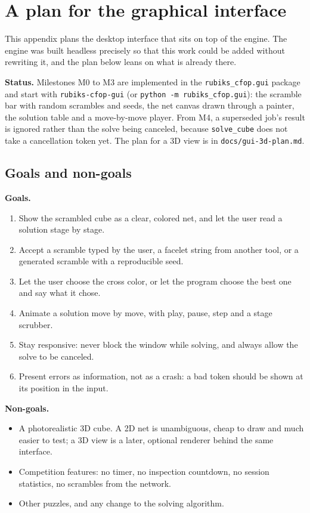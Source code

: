 \section{A plan for the graphical interface}
\label{app:gui}

This appendix plans the desktop interface that sits on top of the engine.  The
engine was built headless precisely so that this work could be added without
rewriting it, and the plan below leans on what is already there.

\textbf{Status.}  Milestones M0 to M3 are implemented in the \texttt{rubiks\_cfop.gui}
package and start with \texttt{rubiks-cfop-gui} (or \texttt{python -m
rubiks\_cfop.gui}): the scramble bar with random scrambles and seeds, the net
canvas drawn through a painter, the solution table and a move-by-move player.  From
M4, a superseded job's result is ignored rather than the solve being canceled,
because \texttt{solve\_cube} does not take a cancellation token yet.  The plan for a
3D view is in \texttt{docs/gui-3d-plan.md}.

\subsection{Goals and non-goals}

\textbf{Goals.}

\begin{enumerate}[leftmargin=1.4em]
  \item Show the scrambled cube as a clear, colored net, and let the user read a
  solution stage by stage.
  \item Accept a scramble typed by the user, a facelet string from another tool, or
  a generated scramble with a reproducible seed.
  \item Let the user choose the cross color, or let the program choose the best one
  and say what it chose.
  \item Animate a solution move by move, with play, pause, step and a stage scrubber.
  \item Stay responsive: never block the window while solving, and always allow the
  solve to be canceled.
  \item Present errors as information, not as a crash: a bad token should be shown
  at its position in the input.
\end{enumerate}

\textbf{Non-goals.}

\begin{itemize}[leftmargin=1.4em]
  \item A photorealistic 3D cube.  A 2D net is unambiguous, cheap to draw and much
  easier to test; a 3D view is a later, optional renderer behind the same interface.
  \item Competition features: no timer, no inspection countdown, no session
  statistics, no scrambles from the network.
  \item Other puzzles, and any change to the solving algorithm.
\end{itemize}


